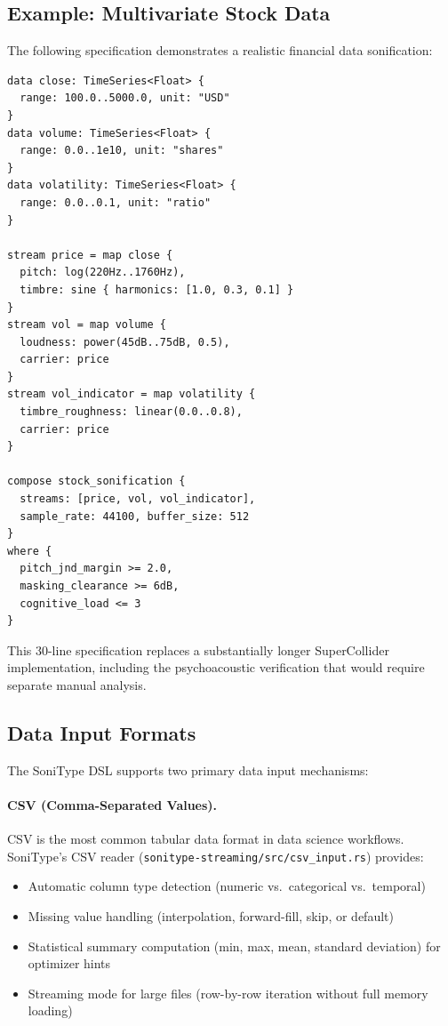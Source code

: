 \documentclass[sigchi, nonacm]{acmart}
\begin{document}
\subsection{Example: Multivariate Stock Data}

The following specification demonstrates a realistic financial data sonification:

\begin{lstlisting}[caption={Stock price sonification with volume and volatility.},label={lst:stock}]
data close: TimeSeries<Float> {
  range: 100.0..5000.0, unit: "USD"
}
data volume: TimeSeries<Float> {
  range: 0.0..1e10, unit: "shares"
}
data volatility: TimeSeries<Float> {
  range: 0.0..0.1, unit: "ratio"
}

stream price = map close {
  pitch: log(220Hz..1760Hz),
  timbre: sine { harmonics: [1.0, 0.3, 0.1] }
}
stream vol = map volume {
  loudness: power(45dB..75dB, 0.5),
  carrier: price
}
stream vol_indicator = map volatility {
  timbre_roughness: linear(0.0..0.8),
  carrier: price
}

compose stock_sonification {
  streams: [price, vol, vol_indicator],
  sample_rate: 44100, buffer_size: 512
}
where {
  pitch_jnd_margin >= 2.0,
  masking_clearance >= 6dB,
  cognitive_load <= 3
}
\end{lstlisting}

This 30-line specification replaces a substantially longer SuperCollider implementation, including the psychoacoustic verification that would require separate manual analysis.

\subsection{Data Input Formats}

The SoniType DSL supports two primary data input mechanisms:

\paragraph{CSV (Comma-Separated Values).} CSV is the most common tabular data format in data science workflows. SoniType's CSV reader (\texttt{sonitype-streaming/src/csv\_input.rs}) provides:

\begin{itemize}
    \item Automatic column type detection (numeric vs.\ categorical vs.\ temporal)
    \item Missing value handling (interpolation, forward-fill, skip, or default)
    \item Statistical summary computation (min, max, mean, standard deviation) for optimizer hints
    \item Streaming mode for large files (row-by-row iteration without full memory loading)
\end{itemize}
\end{document}
